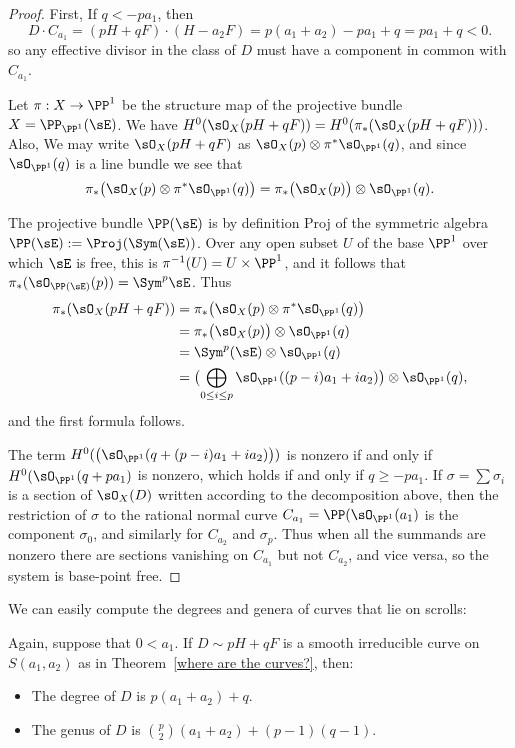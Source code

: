 \begin{proof} First, If $q<-pa_{1}$, then 
$$
D\cdot C_{a_{1}} = (pH+qF) \cdot (H-a_{2}F) = p(a_{1}+a_{2}) -pa_{1}+q = pa_{1}+q < 0.
$$
so any effective divisor in the class of $D$ must have a component in common with $C_{a_{1}}$.

Let $\pi:X\to \PP^{1}$ be the structure map of the projective bundle $X = \PP_{\PP^{1}}(\sE)$.
We have $H^{0}(\sO_{X}(pH+qF)) = H^{0}(\pi_{*}(\sO_{X}(pH+qF)))$. Also, 
We may write $\sO_{X}(pH+qF)$ as $\sO_{X}(p) \otimes \pi^{*}\sO_{\PP^{1}}(q)$, and since
$\sO_{\PP^{1}}(q)$ is a line bundle we see that 
$$
\pi_{*}\bigl(\sO_{X}(p) \otimes \pi^{*}\sO_{\PP^{1}}(q)\bigr) 
 = \pi_{*}\bigl(\sO_{X}(p)\bigr)\otimes \sO_{\PP^{1}}(q).
$$

The projective bundle $\PP(\sE)$ is
by definition Proj of the symmetric algebra $\PP(\sE):=\Proj(\Sym(\sE))$. Over any open 
subset $U$ of the base $\PP^1$ over which $\sE$ is free, this is $\pi^{-1}(U) = U\times \PP^1$,
and it follows that $\pi_*(\sO_{\PP(\sE)}(p)) = \Sym^p\sE$. 
Thus 
\begin{align*}
\pi_{*}(\sO_{X}(pH+qF)) &= 
\pi_{*}\bigl(\sO_{X}(p) \otimes \pi^{*}\sO_{\PP^{1}}(q)\bigr) \\
 &= \pi_{*}\bigl(\sO_{X}(p)\bigr)\otimes \sO_{\PP^{1}}(q)\\
&=  \Sym^{p}(\sE)\otimes \sO_{\PP^{1}}(q)\\
&=  \bigl(\bigoplus_{0\leq i\leq p} \sO_{\PP^{1}}((p-i)a_{1}+i a_{2})\bigr) \otimes \sO_{\PP^{1}}(q),
\end{align*}
and the first formula follows. 

The term 
$H^{0}(\bigl(\sO_{\PP^{1}}(q + (p-i)a_{1}+i a_{2})\bigr))$ is nonzero if and only if 
$H^{0}(\sO_{\PP^{1}}(q + pa_{1})$ is nonzero, which holds if and only if $q\geq -pa_{1}$.
If $\sigma = \sum \sigma_i$ is a section of $\sO_X(D)$ written according to the decomposition
above, then the restriction of $\sigma$ to  the rational normal curve $C_{a_1} = \PP(\sO_{\PP^1}(a_1)$ is the component $\sigma_0$, and similarly for $C_{a_2}$ and $\sigma_p$. Thus when  all the summands are nonzero
there are sections  vanishing on $C_{a_{1}}$ but not $C_{a_{2}}$, and vice versa, so the system is base-point free. 
\end{proof}

 
We can easily compute the degrees and genera of curves that lie on scrolls:

\begin{proposition}Again, suppose that $0<a_{1}$.
If $D\sim pH+qF$ is a smooth irreducible curve on $S(a_{1}, a_{2})$ as in Theorem~\ref{where are the curves?}, then: 
\begin{itemize}
 \item The degree of $D$ is $p(a_{1}+a_{2}) +q$.
 \item The genus of $D$ is ${p\choose 2}(a_{1}+a_{2}) + (p-1)(q-1)$.
\end{itemize}
\end{proposition}
  
